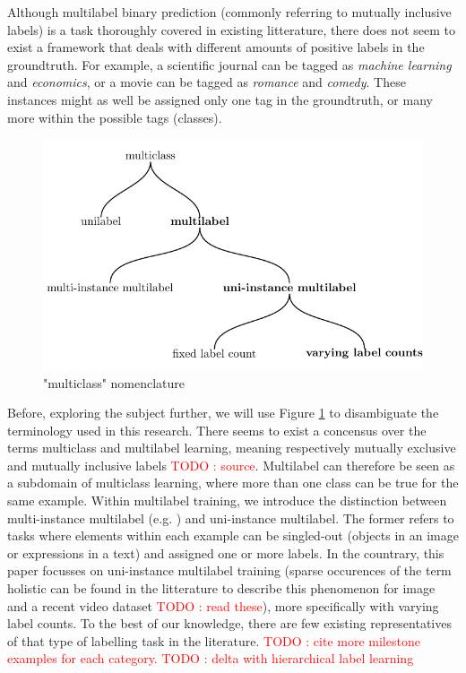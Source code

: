 \documentclass[sigconf,natbib,screen=true,review=true,anonymous]{acmart}
\newcommand\todo[1]{\textcolor{red}{TODO : #1}}
\begin{document}
Although multilabel binary prediction (commonly referring to mutually inclusive labels) is a task thoroughly covered in existing litterature, there does not seem to exist a framework that deals with different amounts of positive labels in the groundtruth. For example, a scientific journal can be tagged as \emph{machine learning} and \emph{economics}, or a movie can be tagged as \emph{romance} and \emph{comedy}. These instances might as well be assigned only one tag in the groundtruth, or many more within the possible tags (classes).

\begin{figure}[htbp]
\centering
\includegraphics[width=.9\linewidth]{./tree/Tree.pdf}
\caption{\label{fig:tree}
"multiclass" nomenclature}
\end{figure}

Before, exploring the subject further, we will use Figure \ref{fig:tree} to disambiguate the terminology used in this research. There seems to exist a concensus over the terms multiclass and multilabel learning, meaning respectively mutually exclusive and mutually inclusive labels \todo{source}. Multilabel can therefore be seen as a subdomain of multiclass learning, where more than one class can be true for the same example. Within multilabel training, we introduce the distinction between multi-instance multilabel (e.g. \cite{multiInstance}) and uni-instance multilabel. The former refers to tasks where elements within each example can be singled-out (objects in an image or expressions in a text) and assigned one or more labels. In the countrary, this paper focusses on uni-instance multilabel training (sparse occurences of the term holistic can be found in the litterature to describe this phenomenon for image \cite{holisticImageDescriptors,holisticLungs} and a recent video dataset \cite{holisticVideoData} \todo{read these}), more specifically with varying label counts. To the best of our knowledge, there are few existing representatives of that type of labelling task in the literature. \todo{cite more milestone examples for each category.} \todo{delta with hierarchical label learning}
\end{document}
